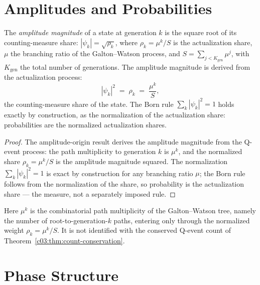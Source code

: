 \section{Amplitudes and Probabilities}
\label{c09:sec:amplitudes}

\begin{theorem}
\label{c09:thm:amplitude-derived}
The \emph{amplitude magnitude} of a state at generation $k$ is the square root of its
counting-measure share: $|\psi_k| = \sqrt{\rho_k}$, where
$\rho_k = \mu^k/S$ is the actualization share, $\mu$ the branching ratio of the
Galton--Watson process, and $S = \sum_{j<K_{\mathrm{gen}}}\mu^j$, with $K_{\mathrm{gen}}$ the
total number of generations. The amplitude magnitude is derived from
the actualization process:
\begin{equation}
\label{c09:eq:amplitude}
|\psi_k|^2 \;=\; \rho_k \;=\; \frac{\mu^k}{S},
\end{equation}
the counting-measure share of the state. The Born rule $\sum_k|\psi_k|^2 = 1$ holds exactly
by construction, as the normalization of the actualization share: probabilities are the
normalized actualization shares.
\end{theorem}

\begin{proof}
The amplitude-origin result \cite{c09:QG216} derives the amplitude magnitude from the Q-event
process: the path multiplicity to generation $k$ is $\mu^k$, and the normalized share
$\rho_k = \mu^k/S$ is the amplitude magnitude squared. The normalization
$\sum_k|\psi_k|^2 = 1$ is exact by construction for any branching ratio $\mu$; the Born
rule follows from the normalization of the share, so probability is the actualization share
--- the measure, not a separately imposed rule.
\end{proof}

Here $\mu^k$ is the combinatorial path multiplicity of the Galton--Watson tree, namely the
number of root-to-generation-$k$ paths, entering only through the normalized weight
$\rho_k = \mu^k/S$. It is not identified with the conserved Q-event count of
Theorem~\ref{c03:thm:count-conservation}.

\section{Phase Structure}
\label{c09:sec:phase}

